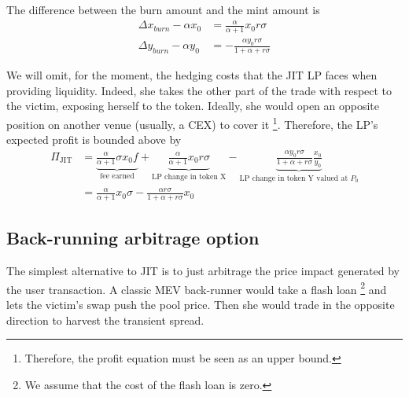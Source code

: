 \documentclass[a4paper,11pt]{article}
\begin{document}
The difference between the burn amount and the mint amount is
\begin{align}
    \Delta x_{burn} - \alpha x_0 &= \frac{\alpha}{\alpha+1}x_0r\sigma \\
    \Delta y_{burn} - \alpha y_0 &= - \frac{\alpha y_0 r \sigma}{1+\alpha+r\sigma}
\end{align}

We will omit, for the moment, the hedging costs that the JIT LP faces when providing liquidity. Indeed, she takes the other part of the trade with respect to the victim, exposing herself to the token. Ideally, she would open an opposite position on another venue (usually, a CEX) to cover it \footnote{Therefore, the profit equation must be seen as an upper bound.}. Therefore,
the LP's expected profit is bounded above by
\begin{align}
    \Pi_{\text{JIT}} &=   \underbrace{\frac{\alpha}{\alpha +1}\sigma x_0f}_{\text{fee earned}}{} + \underbrace{\frac{\alpha}{\alpha+1}x_0r\sigma}_{\text{LP change in token X}} - \underbrace{\frac{\alpha y_0 r \sigma}{1+\alpha+r\sigma}\frac{x_0}{y_0}}_{\text{LP change in token Y valued at }P_0} \\
    &=\frac{\alpha}{\alpha +1} x_0 \sigma - \frac{\alpha r \sigma}{1+\alpha+r\sigma}x_0
\end{align}
\subsection{Back-running arbitrage option}
The simplest alternative to JIT is to just arbitrage the price impact generated by the user transaction. A classic MEV back-runner would take a flash loan \footnote{We assume that the cost of the flash loan is zero.} and lets the victim’s swap push the pool price. Then she would trade in the opposite direction to harvest the transient spread.
\end{document}
